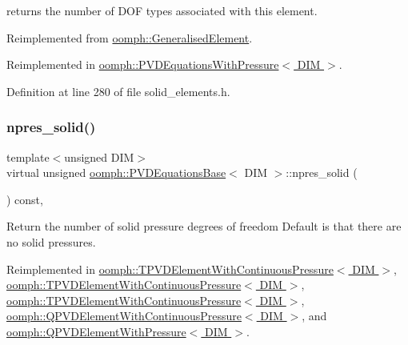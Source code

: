 returns the number of D\+OF types associated with this element. 



Reimplemented from \hyperlink{classoomph_1_1GeneralisedElement_a0c6037a870597b35dcf1c780710b9a56}{oomph\+::\+Generalised\+Element}.



Reimplemented in \hyperlink{classoomph_1_1PVDEquationsWithPressure_ac7b6036faac154cd6a535ab5083c6d84}{oomph\+::\+P\+V\+D\+Equations\+With\+Pressure$<$ D\+I\+M $>$}.



Definition at line 280 of file solid\+\_\+elements.\+h.

\mbox{\label{classoomph_1_1PVDEquationsBase_a6e8457327151e87d2fa5694148afc7cc}} 
\subsubsection{\texorpdfstring{npres\+\_\+solid()}{npres\_solid()}}
{\footnotesize\ttfamily template$<$unsigned D\+IM$>$ \\
virtual unsigned \hyperlink{classoomph_1_1PVDEquationsBase}{oomph\+::\+P\+V\+D\+Equations\+Base}$<$ D\+IM $>$\+::npres\+\_\+solid (\begin{DoxyParamCaption}{ }\end{DoxyParamCaption}) const\hspace{0.3cm}{\ttfamily [inline]}, {\ttfamily [virtual]}}



Return the number of solid pressure degrees of freedom Default is that there are no solid pressures. 



Reimplemented in \hyperlink{classoomph_1_1TPVDElementWithContinuousPressure_ad79413ff3f46e433ce6d8946b7378dca}{oomph\+::\+T\+P\+V\+D\+Element\+With\+Continuous\+Pressure$<$ D\+I\+M $>$}, \hyperlink{classoomph_1_1TPVDElementWithContinuousPressure_a8c72c90b0a9fbf199683bf46cdc7116f}{oomph\+::\+T\+P\+V\+D\+Element\+With\+Continuous\+Pressure$<$ D\+I\+M $>$}, \hyperlink{classoomph_1_1TPVDElementWithContinuousPressure_a3d468e3b84be5dee1ff2d556b82e9554}{oomph\+::\+T\+P\+V\+D\+Element\+With\+Continuous\+Pressure$<$ D\+I\+M $>$}, \hyperlink{classoomph_1_1QPVDElementWithContinuousPressure_a8d5ddf65d4462205dc889af7ba10c527}{oomph\+::\+Q\+P\+V\+D\+Element\+With\+Continuous\+Pressure$<$ D\+I\+M $>$}, and \hyperlink{classoomph_1_1QPVDElementWithPressure_a3be2b5458ab056e38eadb28d27995397}{oomph\+::\+Q\+P\+V\+D\+Element\+With\+Pressure$<$ D\+I\+M $>$}.



